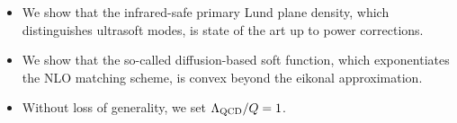 \begin{itemize}
  \item We show that the infrared-safe primary Lund plane density, which distinguishes ultrasoft modes, is state of the art up to power corrections.
  \item We show that the so-called diffusion-based soft function, which exponentiates the NLO matching scheme, is convex beyond the eikonal approximation.
  \item Without loss of generality, we set $\Lambda_{\rm QCD}/Q = 1$.
\end{itemize}

